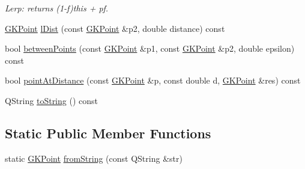 \begin{DoxyCompactItemize}
\begin{DoxyCompactList}\small\item\em Lerp\+: returns (1-\/f)this + pf. \end{DoxyCompactList}\item 
\hyperlink{classGKPoint}{G\+K\+Point} \hyperlink{classGKPoint_a4304568bc5160c754a1ba3c3c675e5df}{l\+Dist} (const \hyperlink{classGKPoint}{G\+K\+Point} \&p2, double distance) const 
\item 
bool \hyperlink{classGKPoint_a16a070f6bb7bff1f727a7d8e528ce20d}{between\+Points} (const \hyperlink{classGKPoint}{G\+K\+Point} \&p1, const \hyperlink{classGKPoint}{G\+K\+Point} \&p2, double epsilon) const 
\item 
bool \hyperlink{classGKPoint_a13dd7de88b383e9a17d7548a5f302fb5}{point\+At\+Distance} (const \hyperlink{classGKPoint}{G\+K\+Point} \&p, const double d, \hyperlink{classGKPoint}{G\+K\+Point} \&res) const 
\item 
Q\+String \hyperlink{classGKPoint_a7441caea1479057d331856f29fc56bb1}{to\+String} () const 
\end{DoxyCompactItemize}
\subsection*{Static Public Member Functions}
\begin{DoxyCompactItemize}
\item 
static \hyperlink{classGKPoint}{G\+K\+Point} \hyperlink{classGKPoint_a338770a72221f1908b6ae340cf9feb88}{from\+String} (const Q\+String \&str)
\end{DoxyCompactItemize}
